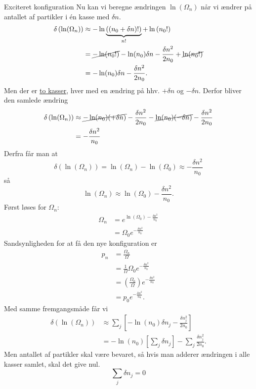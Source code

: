 \begin{opgave}{Exciteret konfiguration}
    Nu kan vi beregne ændringen $\ln(\Omega_n)$ når vi ændrer på antallet af partikler i én kasse med $\delta n$.
    \begin{align*}
        \delta\left(\ln(\Omega_n)\right)&\approx -\ln\underbrace{\left((n_0+\delta n)!\right)}_{\text{$n!$}}+\ln\left(n_0!\right)\\
        &=\cancel{-\ln(n_0!)}-\ln(n_0)\delta n-\frac{\delta n^2}{2n_0}+\cancel{\ln(n_0!)}\\
        &=-\ln(n_0)\delta n-\frac{\delta n^2}{2n_0}.
    \end{align*}
    Men der er \underline{to kasser}, hver med en ændring på hhv. $+\delta n$ og $-\delta n$. Derfor bliver den samlede ændring
    \begin{align*}
        \delta\left(\ln(\Omega_n)\right)&\approx\cancel{-\ln(n_0)(+\delta n)}-\frac{\delta n^2}{2n_0}-\cancel{\ln(n_0)(-\delta n)}-\frac{\delta n^2}{2n_0}\\
        &=-\frac{\delta n^2}{n_0}
    \end{align*}
    Derfra får man at
    \[ \delta\left(\ln(\Omega_n)\right)=\ln(\Omega_n)-\ln(\Omega_0)\approx -\frac{\delta n^2}{n_0} \]
    så
    \[ \ln(\Omega_n)\approx \ln(\Omega_0)-\frac{\delta n^2}{n_0}. \]
    \opg Først løses for $\Omega_n$:
    \begin{align*}
        \Omega_n&=e^{\ln(\Omega_0)-\frac{\delta n^2}{n_0}}\\
        &=\Omega_0 e^{-\frac{\delta n^2}{n_0}}
    \end{align*}
    Sandsynligheden for at få den nye konfiguration er
    \begin{align*} 
        p_n&=\frac{\Omega_n}{\Omega}\\
        &=\frac{1}{\Omega}\Omega_0e^{-\frac{\delta n^2}{n_0}}\\
        &=\left(\frac{\Omega_0}{\Omega}\right)e^{-\frac{\delta n^2}{n_0}}\\
        &=p_0e^{-\frac{\delta n^2}{n_0}}.
    \end{align*}
    \opg Med samme fremgangsmåde får vi
    \begin{align*}
        \delta\left(\ln(\Omega_n)\right)&\approx\sum_j\left[-\ln(n_0)\delta n_j-\frac{\delta n_j^2}{2n_0}\right]\\
        &=-\ln(n_0)\left[\sum_j\delta n_j\right]-\sum_j\frac{\delta n_j^2}{2n_0}.
    \end{align*}
    Men antallet af partikler skal være bevaret, så hvis man adderer ændringen i alle kasser samlet, skal det give nul.
    \[ \sum_j \delta n_j=0 \]

\end{opgave}
